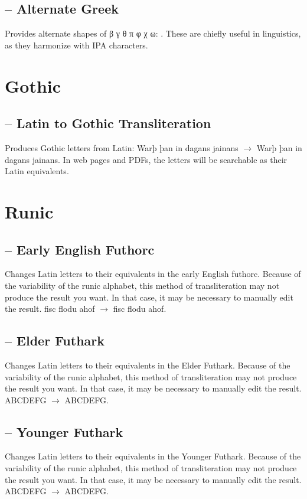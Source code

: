 \subsection{ – Alternate Greek}
Provides alternate shapes of {β γ θ π φ χ ω}:
.
These are chiefly useful in linguistics, as they harmonize with IPA characters.

\section{Gothic}
\subsection{ – Latin to Gothic Transliteration}
Produces Gothic letters from Latin: {Warþ þan in dagans jainans} $\rightarrow $
{\LatinToGothic{}Warþ þan in dagans
jainans}. In web pages and PDFs, the letters will be searchable as their Latin equivalents.

\section{Runic}
\subsection{ – Early English Futhorc}
Changes Latin letters to their equivalents in the early English futhorc. Because of the variability of the runic
alphabet, this method of transliteration may not produce the result you want. In that case, it may be necessary to
manually edit the result. fisc flodu ahof $\rightarrow $ {fisc flodu ahof}.

\subsection{ – Elder
Futhark}
Changes Latin letters to their equivalents in the Elder Futhark. Because of the variability of the runic alphabet, this
method of transliteration may not produce the result you want. In that case, it may be necessary to manually edit the
result. ABCDEFG $\rightarrow $ {ABCDEFG}.

\subsection{ – Younger
Futhark}
Changes Latin letters to their equivalents in the Younger Futhark. Because of the variability of the runic alphabet,
this method of transliteration may not produce the result you want. In that case, it may be necessary to manually edit
the result. ABCDEFG $\rightarrow $ {ABCDEFG}.

